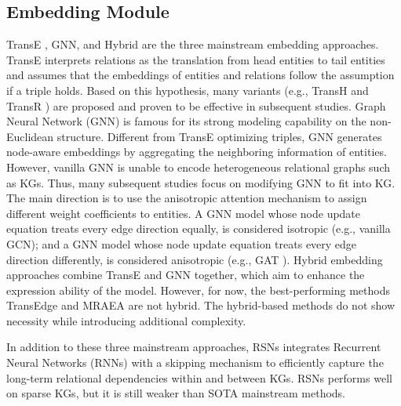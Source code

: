 \documentclass[sigconf]{acmart}
\begin{document}
\subsection{Embedding Module}
TransE \cite{DBLP:conf/nips/BordesUGWY13}, GNN, and Hybrid are the three mainstream embedding approaches.
TransE interprets relations as the translation from head entities to tail entities and assumes that the embeddings of entities and relations follow the assumption  if a triple  holds.
Based on this hypothesis, many variants (e.g., TransH \cite{DBLP:conf/aaai/WangZFC14} and TransR \cite{DBLP:conf/aaai/LinLSLZ15}) are proposed and proven to be effective in subsequent studies.
Graph Neural Network (GNN) is famous for its strong modeling capability on the non-Euclidean structure.
Different from TransE optimizing triples, GNN generates node-aware embeddings by aggregating the neighboring information of entities.
However, vanilla GNN \cite{DBLP:journals/corr/KipfW16} is unable to encode heterogeneous relational graphs such as KGs.
Thus, many subsequent studies focus on modifying GNN to fit into KG.
The main direction is to use the anisotropic attention mechanism \cite{DBLP:conf/iclr/VelickovicCCRLB18} to assign different weight coefficients to entities.
A GNN model whose node update equation treats every edge direction equally, is considered isotropic (e.g., vanilla GCN); and a GNN model whose node update equation treats every edge direction differently, is considered anisotropic (e.g., GAT \cite{DBLP:conf/iclr/VelickovicCCRLB18}).
Hybrid embedding approaches combine TransE and GNN together, which aim to enhance the expression ability of the model.
However, for now, the best-performing methods TransEdge \cite{DBLP:journals/corr/abs-2004-13579} and MRAEA \cite{DBLP:conf/wsdm/MaoWXLW20} are not hybrid.
The hybrid-based methods do not show necessity while introducing additional complexity.

In addition to these three mainstream approaches, RSNs \cite{DBLP:conf/icml/GuoSH19} integrates Recurrent Neural Networks (RNNs) with a skipping mechanism to efficiently capture the long-term relational dependencies within and between KGs.
RSNs performs well on sparse KGs, but it is still weaker than SOTA mainstream methods.
\end{document}
